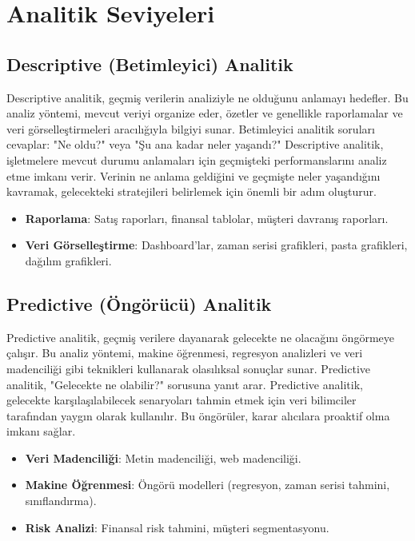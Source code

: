 \section{Analitik Seviyeleri}

\subsection{Descriptive (Betimleyici) Analitik}

Descriptive analitik, geçmiş verilerin analiziyle ne olduğunu anlamayı hedefler. Bu analiz yöntemi, mevcut veriyi organize eder, özetler ve genellikle raporlamalar ve veri görselleştirmeleri aracılığıyla bilgiyi sunar. Betimleyici analitik soruları cevaplar: "Ne oldu?" veya "Şu ana kadar neler yaşandı?" Descriptive analitik, işletmelere mevcut durumu anlamaları için geçmişteki performanslarını analiz etme imkanı verir. Verinin ne anlama geldiğini ve geçmişte neler yaşandığını kavramak, gelecekteki stratejileri belirlemek için önemli bir adım oluşturur.

\begin{itemize}
    \item \textbf{Raporlama}: Satış raporları, finansal tablolar, müşteri davranış raporları.
    \item \textbf{Veri Görselleştirme}: Dashboard'lar, zaman serisi grafikleri, pasta grafikleri, dağılım grafikleri.
\end{itemize}

\subsection{Predictive (Öngörücü) Analitik}

Predictive analitik, geçmiş verilere dayanarak gelecekte ne olacağını öngörmeye çalışır. Bu analiz yöntemi, makine öğrenmesi, regresyon analizleri ve veri madenciliği gibi teknikleri kullanarak olasılıksal sonuçlar sunar. Predictive analitik, "Gelecekte ne olabilir?" sorusuna yanıt arar. Predictive analitik, gelecekte karşılaşılabilecek senaryoları tahmin etmek için veri bilimciler tarafından yaygın olarak kullanılır. Bu öngörüler, karar alıcılara proaktif olma imkanı sağlar.

\begin{itemize}
    \item \textbf{Veri Madenciliği}: Metin madenciliği, web madenciliği.
    \item \textbf{Makine Öğrenmesi}: Öngörü modelleri (regresyon, zaman serisi tahmini, sınıflandırma).
    \item \textbf{Risk Analizi}: Finansal risk tahmini, müşteri segmentasyonu.
\end{itemize}

